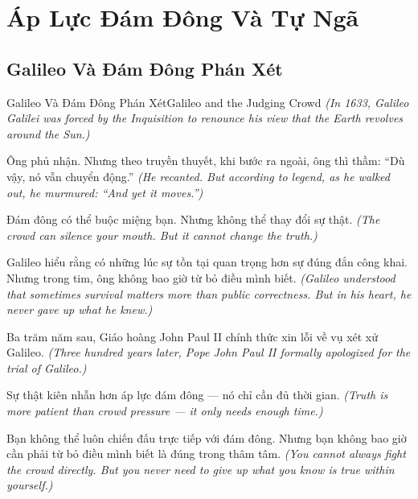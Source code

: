 \chapter{Áp Lực Đám Đông Và Tự Ngã}

\section{Galileo Và Đám Đông Phán Xét}
\begin{truyen}{Galileo Và Đám Đông Phán Xét}{Galileo and the Judging Crowd}
\textit{(In 1633, Galileo Galilei was forced by the Inquisition to renounce his view that the Earth revolves around the Sun.)}

Ông phủ nhận. Nhưng theo truyền thuyết, khi bước ra ngoài, ông thì thầm: ``Dù vậy, nó vẫn chuyển động.''
\textit{(He recanted. But according to legend, as he walked out, he murmured: ``And yet it moves.'')}

Đám đông có thể buộc miệng bạn. Nhưng không thể thay đổi sự thật.
\textit{(The crowd can silence your mouth. But it cannot change the truth.)}

Galileo hiểu rằng có những lúc sự tồn tại quan trọng hơn sự đúng đắn công khai. Nhưng trong tim, ông không bao giờ từ bỏ điều mình biết.
\textit{(Galileo understood that sometimes survival matters more than public correctness. But in his heart, he never gave up what he knew.)}

Ba trăm năm sau, Giáo hoàng John Paul II chính thức xin lỗi về vụ xét xử Galileo.
\textit{(Three hundred years later, Pope John Paul II formally apologized for the trial of Galileo.)}

Sự thật kiên nhẫn hơn áp lực đám đông — nó chỉ cần đủ thời gian.
\textit{(Truth is more patient than crowd pressure — it only needs enough time.)}

\end{truyen}

\begin{baihoc}
Bạn không thể luôn chiến đấu trực tiếp với đám đông. Nhưng bạn không bao giờ cần phải từ bỏ điều mình biết là đúng trong thâm tâm.
\textit{(You cannot always fight the crowd directly. But you never need to give up what you know is true within yourself.)}
\end{baihoc}
\ngancach

